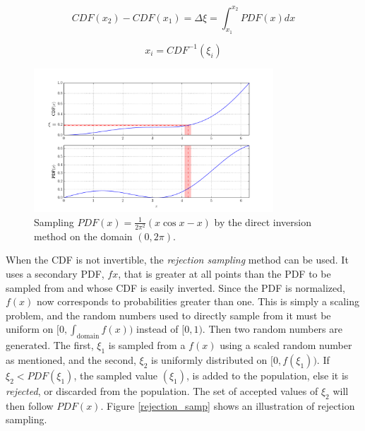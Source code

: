 \begin{equation}
\label{CDF_property2}
CDF(x_2) - CDF(x_1) = \Delta \xi =  \int_{x_1}^{x_2} PDF(x) dx
\end{equation}

\begin{equation}
\label{CDF_inversion}
 x_i = CDF^{-1}(\xi_i)
\end{equation}

\begin{figure}[h!] 
  \centering
    \includegraphics[width=0.8\textwidth]{graphics/direct_samp.pdf}
     \caption{Sampling $PDF(x)=\frac{1}{2\pi^2}(x \cos x - x)$ by the direct inversion method on the domain $(0,2\pi)$. \label{direct_samp}}
\end{figure}

When the CDF is not invertible, the \emph{rejection sampling} method can be used.  It uses a secondary PDF, $f{x}$, that is greater at all points than the PDF to be sampled from and whose CDF is easily inverted.  Since the PDF is normalized, $f(x)$ now corresponds to probabilities greater than one.  This is simply a scaling problem, and the random numbers used to directly sample from it must be uniform on $[0,\int_\mathrm{domain}f(x))$ instead of $[0,1)$.   Then two random numbers are generated.  The first, $\xi_1$ is sampled from a $f(x)$ using a scaled random number as mentioned, and the second, $\xi_2$ is uniformly distributed on $[0,f(\xi_1))$.  If $\xi_2 < PDF(\xi_1)$, the sampled value $(\xi_1)$, is added to the population, else it is \emph{rejected}, or discarded from the population.  The set of accepted values of ${\xi_2}$ will then follow $PDF(x)$.  Figure \ref{rejection_samp} shows an illustration of rejection sampling.

